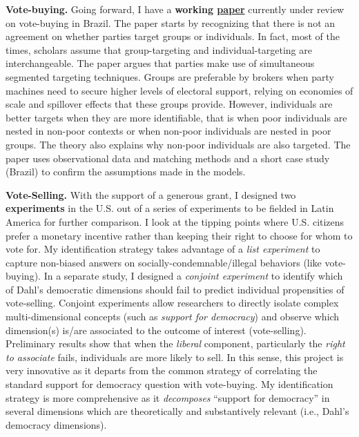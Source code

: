 \documentclass[11pt]{letter} %
\begin{document}
\begin{letter}{}
{\bf Vote-buying.} Going forward, I have a {\bf working \href{https://github.com/hbahamonde/Clientelism_paper/raw/master/Bahamonde_Clientelism_Paper.pdf}{paper}} currently under review on vote-buying in Brazil. The paper starts by recognizing that there is not an agreement on whether parties target groups or individuals. In fact, most of the times, scholars assume that group-targeting and individual-targeting are interchangeable. The paper argues that parties make use of simultaneous segmented targeting techniques. Groups are preferable by brokers when party machines need to secure higher levels of electoral support, relying on economies of scale and spillover effects that these groups provide. However, individuals are better targets when they are more identifiable, that is when poor individuals are nested in non-poor contexts or when non-poor individuals are nested in poor groups. The theory also explains why non-poor individuals are also targeted. The paper uses observational data and matching methods and a short case study (Brazil) to confirm the assumptions made in the models.

{\bf Vote-Selling.} With the support of a generous grant, I designed two {\bf experiments} in the U.S. out of a series of experiments to be fielded in Latin America for further comparison. I look at the tipping points where U.S. citizens prefer a monetary incentive rather than keeping their right to choose for whom to vote for. My identification strategy takes advantage of a \emph{list experiment} to capture non-biased answers on socially-condemnable/illegal behaviors (like vote-buying). In a separate study, I designed a \emph{conjoint experiment} to identify which of Dahl's democratic dimensions should fail to predict individual propensities of vote-selling. Conjoint experiments allow researchers to directly isolate complex multi-dimensional concepts (such as \emph{support for democracy}) and observe which dimension(s) is/are associated to the outcome of interest (vote-selling). Preliminary results show that when the \emph{liberal} component, particularly the \emph{right to associate} fails, individuals are more likely to sell. In this sense, this project is very innovative as it departs from the common strategy of correlating the standard support for democracy question with vote-buying. My identification strategy is more comprehensive as it \emph{decomposes} ``support for democracy'' in several dimensions which are theoretically and substantively relevant (i.e., Dahl's democracy dimensions). 



\end{letter}
\end{document}
